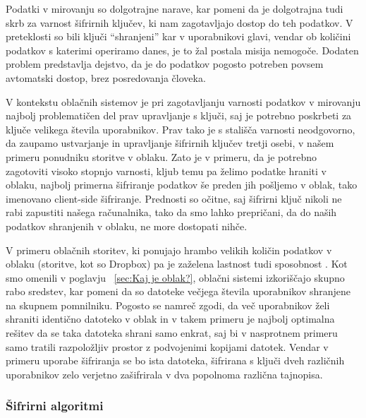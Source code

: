 \documentclass[12pt,a4paper,openany]{book}
\begin{document}
Podatki v mirovanju so dolgotrajne narave, kar pomeni da je dolgotrajna tudi skrb za varnost šifrirnih ključev, ki nam zagotavljajo dostop do teh podatkov. V preteklosti so bili ključi ``shranjeni'' kar v uporabnikovi glavi, vendar ob količini podatkov s katerimi operiramo danes, je to žal postala misija nemogoče. Dodaten problem predstavlja dejstvo, da je do podatkov pogosto potreben povsem avtomatski dostop, brez posredovanja človeka.

V kontekstu oblačnih sistemov je pri zagotavljanju varnosti podatkov v mirovanju najbolj problematičen del prav upravljanje s ključi, saj je potrebno poskrbeti za ključe velikega števila uporabnikov. Prav tako je s stališča varnosti neodgovorno, da zaupamo ustvarjanje in upravljanje šifrirnih ključev tretji osebi, v našem primeru ponudniku storitve v oblaku. Zato je v primeru, da je potrebno zagotoviti visoko stopnjo varnosti, kljub temu pa želimo podatke hraniti v oblaku, najbolj primerna šifriranje podatkov še preden jih pošljemo v oblak, tako imenovano client-side šifriranje. Prednosti so očitne, saj šifrirni ključ nikoli ne rabi zapustiti našega računalnika, tako da smo lahko prepričani, da do naših podatkov shranjenih v oblaku, ne more dostopati nihče.

V primeru oblačnih storitev, ki ponujajo hrambo velikih količin podatkov v oblaku (storitve, kot so Dropbox) pa je zaželena lastnost tudi sposobnost . Kot smo omenili v poglavju ~\ref{sec:Kaj je oblak?}, oblačni sistemi izkoriščajo skupno rabo sredstev, kar pomeni da so datoteke večjega števila uporabnikov shranjene na skupnem pomnilniku. Pogosto se namreč zgodi, da več uporabnikov želi shraniti identično datoteko v oblak in v takem primeru je najbolj optimalna rešitev da se taka datoteka shrani samo enkrat, saj bi v nasprotnem primeru samo tratili razpoložljiv prostor z podvojenimi kopijami datotek. Vendar v primeru uporabe šifriranja se bo ista datoteka, šifrirana s ključi dveh različnih uporabnikov zelo verjetno zašifrirala v dva popolnoma različna tajnopisa.


\subsubsection{Šifrirni algoritmi}
\label{subs:Šifrirni algoritmi}
\end{document}
